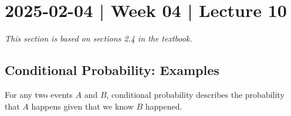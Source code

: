 \documentclass[10pt]{article}
\theoremstyle{definition}
\newtheorem{example}[theorem]{Example}
\renewenvironment{example}
{\begin{oldexample}}
  {\par\smallskip\hfill   End of Example~\theexample. $\square$    \par\end{oldexample}}
\newcommand{\1}[1]{\textbf{1}_{\left[#1\right]}} %
\newcommand{\dempfcolor}[1]{{\color{RoyalBlue}#1}}
\newcommand{\demph}[1]{\dempfcolor{{\sl \textbf{#1}}}}
\begin{document}
\newpage


\section{2025-02-04 | Week 04 | Lecture 10}
\textit{This section is based on sections 2.4 in the textbook.}


\subsection{Conditional Probability: Examples}
For any two events $A$ and $B$, conditional probability describes the probability that $A$ happens given
that we know $B$ happened.
\end{document}
